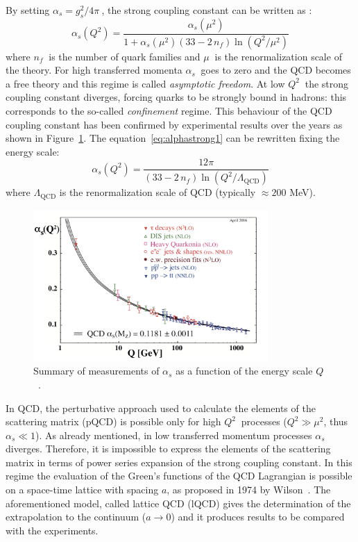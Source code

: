 By setting $\alpha_{s} = g^{2}_{s}/4\pi\ $, the strong coupling constant can be written as \cite{pdg}:
\begin{equation} \label{eq:alphastrong1}
    \alpha_{s}(Q^{2}) = \frac{\alpha_{s}(\mu^{2})}{1 + \alpha_{s}(\mu^{2})(33 - 2\,n_{f})
    \ln(Q^{2}/\mu^{2})}
\end{equation}
where $n_{f}\ $ is the number of quark families and $\mu\ $ is the renormalization scale of 
the theory.
For high transferred momenta $\alpha_{s}\ $ goes to zero and the QCD becomes a free theory and 
this regime is called \textit{asymptotic freedom}. At low $Q^{2}\ $ the strong coupling constant diverges,
forcing quarks to be strongly bound in hadrons: this corresponds to the so-called \textit{confinement} regime. 
This behaviour of the QCD coupling constant has been confirmed by experimental results over the
years as shown in Figure~\ref{fig:alpharun}.
The equation~\eqref{eq:alphastrong1} can be rewritten fixing the energy scale:
\begin{equation} \label{eq:alphastrong2}
    \alpha_{s}(Q^{2}) = \frac{12 \pi}{(33 - 2\,n_{f})\ln(Q^{2}/\Lambda_{\mathrm{QCD}})}
\end{equation}
where $\Lambda_{\mathrm{QCD}}$ is the renormalization scale of QCD (typically $\approx 200$ MeV).

\begin{figure}
    \captionsetup{justification=centering}
    \centering
    \includegraphics[width=0.8\textwidth]{gfx/alpharun}
	\caption{Summary of measurements of $\alpha_{s}$ as a function of the energy scale $Q$~\cite{pdg}.}
	\label{fig:alpharun}
\end{figure}

In QCD, the perturbative approach used to calculate the elements of the scattering matrix (pQCD) is 
possible only for high $Q^{2}\ $ processes ($Q^{2} \gg \mu^{2}$, thus $\alpha_{s} \ll 1$).
As already mentioned, in low transferred momentum processes $\alpha_{s}$ diverges. 
Therefore, it is impossible to express the elements of the scattering matrix in terms of power series
expansion of the strong coupling constant.
In this regime the evaluation of the Green’s functions of the QCD Lagrangian is possible
on a space-time lattice with spacing $a$, as proposed in 1974 by Wilson~\cite{lattice}.
The aforementioned model, called lattice QCD (lQCD) gives the determination of the extrapolation to 
the continuum ($a \rightarrow 0$) and it produces results to be compared with the experiments.

